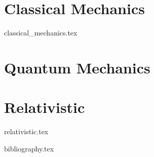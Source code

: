 \documentclass[a4paper, 12pt]{book}
\begin{document}
\part{\LARGE{Classical Mechanics}}
{classical_mechanics.tex}

\part{\LARGE{Quantum Mechanics}}

\part{\LARGE{Relativistic}}
{relativistic.tex}


\backmatter
{bibliography.tex}
\end{document}
